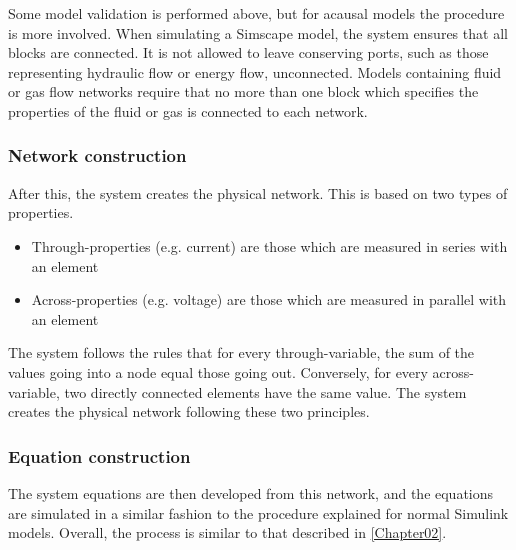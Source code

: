 \documentclass[\rootfolder/main.tex]{subfiles}
\begin{document}
Some model validation is performed above, but for acausal models the procedure is more involved.
When simulating a Simscape model, the system ensures that all blocks are connected.
It is not allowed to leave conserving ports, such as those representing hydraulic flow or energy flow, unconnected.
Models containing fluid or gas flow networks require that no more than one block which specifies the properties of the fluid or gas is connected to each network.

\subsubsection{Network construction}

After this, the system creates the physical network.
This is based on two types of properties.

\begin{itemize}
    \item Through-properties (e.g. current) are those which are measured in series with an element
    \item Across-properties (e.g. voltage) are those which are measured in parallel with an element
\end{itemize}

The system follows the rules that for every through-variable, the sum of the values going into a node equal those going out.
Conversely, for every across-variable, two directly connected elements have the same value.
The system creates the physical network following these two principles.

\subsubsection{Equation construction}

The system equations are then developed from this network, and the equations are simulated in a similar fashion to the procedure explained for normal Simulink models.
Overall, the process is similar to that described in \cref{Chapter02}.
\end{document}
